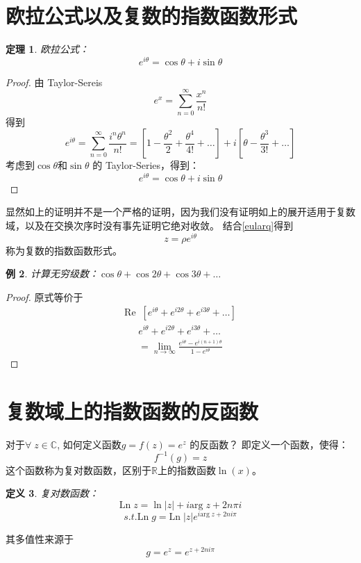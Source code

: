 \documentclass[10pt, a4paper, oneside]{ctexbook}
\newtheorem{theorem}{定理}[section]
\newtheorem{definition}[theorem]{定义}
\newtheorem{example}[theorem]{例}
\begin{document}
\section{欧拉公式以及复数的指数函数形式}

\begin{theorem}
    欧拉公式：
    $$e^{i\theta}=\cos \theta + i \sin \theta$$
\end{theorem}
\begin{proof}
    由 Taylor-Sereis
$$
e^x= \sum_{n=0}^\infty \frac{x^n}{n!}
$$
得到
$$
e^{i\theta}= \sum_{n=0}^\infty \frac{i^n\theta^n}{n!}=\left[ 1-\frac{\theta^2}{2}+\frac{\theta^4}{4!}+\dots \right]+ i \left[ \theta-\frac{\theta^3}{3!}+\dots \right]
$$
考虑到$\cos \theta$和$\sin \theta$ 的 Taylor-Series，得到：
$$
e^{i\theta}= \cos \theta + i \sin \theta
$$
\end{proof}
显然如上的证明并不是一个严格的证明，因为我们没有证明如上的展开适用于复数域，以及在交换次序时没有事先证明它绝对收敛。
结合\ref{eularq}得到$$z=\rho e^{i\theta}$$称为复数的指数函数形式。
\begin{example}
    计算无穷级数：$\cos \theta + \cos 2\theta + \cos 3\theta + \dots$
\end{example}
\begin{proof}
    原式等价于
    \begin{align*}
        \mathrm{Re} \;\; [e^{i\theta}+e^{i2\theta}+e^{i3\theta}+\dots]
    \end{align*}
    \begin{align*}
        e^{i\theta}+e^{i2\theta}+e^{i3\theta}+\dots\\
        =\lim_{n\to \infty} \frac{\displaystyle e^{i\theta}-e^{i(n+1)\theta}}{\displaystyle 1-e^{i\theta}}
    \end{align*}
\end{proof}

\section{复数域上的指数函数的反函数}
对于$\forall \; z\in \mathbb{C}$, 如何定义函数$g=f(z)=e^{z}$ 的反函数？
即定义一个函数，使得：
\begin{equation*}
    f^{-1}(g)=z
\end{equation*}
这个函数称为复对数函数，区别于$\mathbb{R}$上的指数函数$\ln(x)$。
\begin{definition}
    复对数函数：$$\mathrm{Ln}\;z=\ln |z| + i\mathrm{arg} \;z +2n\pi i$$
    $$s.t. \mathrm{Ln}\;g  = \mathrm{Ln}\; |z|e^{i\mathrm{arg}\;z+2ni\pi} $$
\end{definition}
其多值性来源于
$$
g=e^z=e^{z+2ni\pi}
$$
\end{document}
